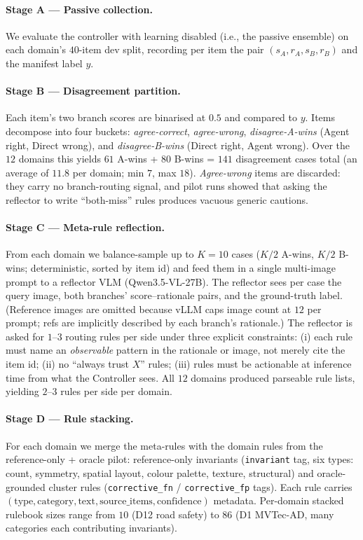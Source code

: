\paragraph{Stage A --- Passive collection.} We evaluate the controller with
learning disabled (i.e., the passive ensemble) on each domain's $40$-item dev split,
recording per item the pair $(s_A, r_A, s_B, r_B)$ and the manifest
label $y$.

\paragraph{Stage B --- Disagreement partition.} Each item's two
branch scores are binarised at $0.5$ and compared to $y$. Items
decompose into four buckets: \emph{agree-correct}, \emph{agree-wrong},
\emph{disagree-A-wins} (Agent right, Direct wrong), and
\emph{disagree-B-wins} (Direct right, Agent wrong). Over the $12$
domains this yields $61$ A-wins + $80$ B-wins = $141$ disagreement
cases total (an average of $11.8$ per domain; min $7$, max $18$).
\emph{Agree-wrong} items are discarded: they carry no
branch-routing signal, and pilot runs showed that asking the
reflector to write ``both-miss'' rules produces vacuous generic
cautions.

\paragraph{Stage C --- Meta-rule reflection.} From each domain we
balance-sample up to $K{=}10$ cases ($K/2$ A-wins, $K/2$ B-wins;
deterministic, sorted by item id) and feed them in a single
multi-image prompt to a reflector VLM (Qwen3.5-VL-27B). The reflector
sees per case the query image, both branches' score--rationale pairs,
and the ground-truth label. (Reference images are omitted because
vLLM caps image count at $12$ per prompt; refs are implicitly
described by each branch's rationale.) The reflector is asked for
$1$--$3$ routing rules per side under three explicit constraints:
(i) each rule must name an \emph{observable} pattern in the
rationale or image, not merely cite the item id; (ii) no ``always
trust $X$'' rules; (iii) rules must be actionable at inference time
from what the Controller sees. All $12$ domains produced parseable
rule lists, yielding $2$--$3$ rules per side per domain.

\paragraph{Stage D --- Rule stacking.} For each domain we merge the
meta-rules with the domain rules from the reference-only + oracle
pilot: reference-only invariants (\texttt{invariant} tag, six types:
count, symmetry, spatial layout, colour palette, texture,
structural) and oracle-grounded cluster rules
(\texttt{corrective\_fn} / \texttt{corrective\_fp} tags). Each rule
carries $(\mathrm{type}, \mathrm{category}, \mathrm{text},
\mathrm{source\_items}, \mathrm{confidence})$ metadata. Per-domain
stacked rulebook sizes range from $10$ (D12 road safety) to $86$
(D1 MVTec-AD, many categories each contributing invariants).

